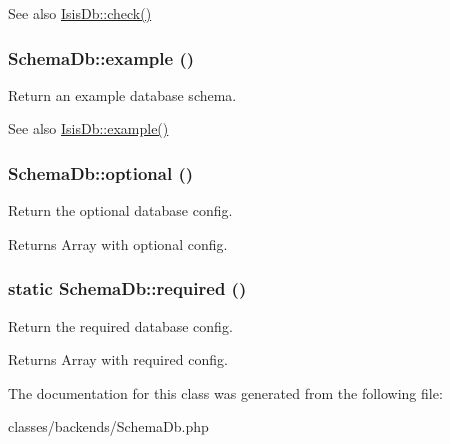 \begin{DoxySeeAlso}{See also}
\hyperlink{interfaceIsisDb_af681b8f990b579f1835aa7ba4c83f1b8}{IsisDb::check()} 
\end{DoxySeeAlso}
\hypertarget{classSchemaDb_a923a94169459c4dee3f74000b4aa1807}{
\subsubsection[{example}]{\setlength{\rightskip}{0pt plus 5cm}SchemaDb::example ()}}
\label{classSchemaDb_a923a94169459c4dee3f74000b4aa1807}
Return an example database schema.

\begin{DoxySeeAlso}{See also}
\hyperlink{interfaceIsisDb_a857c10d90da64067efa17afb2f32edb6}{IsisDb::example()} 
\end{DoxySeeAlso}
\hypertarget{classSchemaDb_af5c9271759bed2f9cccc80a05f7c5da8}{
\subsubsection[{optional}]{\setlength{\rightskip}{0pt plus 5cm}SchemaDb::optional ()}}
\label{classSchemaDb_af5c9271759bed2f9cccc80a05f7c5da8}
Return the optional database config.

\begin{DoxyReturn}{Returns}
Array with optional config. 
\end{DoxyReturn}
\hypertarget{classSchemaDb_a31db21bccb179162b5bb02b14b72d3e3}{
\subsubsection[{required}]{\setlength{\rightskip}{0pt plus 5cm}static SchemaDb::required ()}}
\label{classSchemaDb_a31db21bccb179162b5bb02b14b72d3e3}
Return the required database config.

\begin{DoxyReturn}{Returns}
Array with required config. 
\end{DoxyReturn}


The documentation for this class was generated from the following file:\begin{DoxyCompactItemize}
\item 
classes/backends/SchemaDb.php\end{DoxyCompactItemize}
